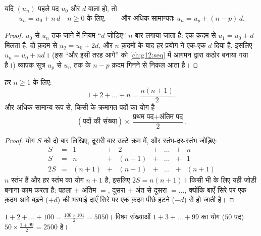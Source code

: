 \begin{theorem}[व्यापक पद]\label{thm:g11:seq:arithgeneral}
यदि $(u_n)$ पहले पद $u_0$ और  $d$ वाला  हो, तो
\[
u_n = u_0 + n\,d \quad n \geq 0 \text{ के लिए},
\qquad\text{और अधिक सामान्यतः } u_n = u_p + (n - p)\,d .
\]
\end{theorem}

\begin{proof}
$u_0$ से $u_n$ तक जाने में नियम ``$d$ जोड़िए'' $n$ बार लगाया जाता है: एक
क़दम से $u_1 = u_0 + d$ मिलता है, दो क़दम से $u_2 = u_0 + 2d$, और $n$ क़दमों के बाद हर प्रयोग ने
एक-एक $d$ दिया है, इसलिए $u_n = u_0 + nd$। (इस ``और इसी तरह आगे'' को \cref{ch:g12:seq} में आगमन
द्वारा कठोर बनाया गया है।) व्यापक सूत्र $u_p$ से $u_n$ तक के $n - p$ क़दम गिनने
से निकल आता है।
\end{proof}

\begin{theorem}[क्रमागत पूर्णांकों का योग]\label{thm:g11:seq:intsum}
हर  $n \geq 1$ के लिए:
\[
1 + 2 + \dots + n = \frac{n(n+1)}{2}.
\]
और अधिक सामान्य रूप से, किसी  के क्रमागत पदों का योग है
\[
(\text{पदों की संख्या}) \times
\frac{\text{प्रथम पद} + \text{अंतिम पद}}{2}.
\]
\end{theorem}

\begin{proof}
योग $S$ को दो बार लिखिए, दूसरी बार उल्टे क्रम में, और स्तंभ-दर-स्तंभ
जोड़िए:
\[
\begin{array}{ccccccccc}
S & = & 1 & + & 2 & + & \dots & + & n\\
S & = & n & + & (n-1) & + & \dots & + & 1\\
\hline
2S & = & (n+1) & + & (n+1) & + & \dots & + & (n+1)
\end{array}
\]
$n$ स्तंभ हैं और हर स्तंभ का योग $n + 1$ है, इसलिए $2S = n(n+1)$। किसी भी  के लिए यही जोड़ी बनाना काम करता है: पहला $+$ अंतिम $=$, दूसरा
$+$ अंत से दूसरा $= \dots$, क्योंकि बाएँ सिरे पर एक क़दम आगे बढ़ने ($+d$) की
भरपाई दाएँ सिरे पर एक क़दम पीछे हटने ($-d$) से हो जाती है।
\end{proof}

\begin{example}
$1 + 2 + \dots + 100 = \frac{100 \times 101}{2} = 5050$। विषम संख्याओं $1 + 3 + \dots + 99$ का योग ($50$ पद) $50 \times \frac{1 + 99}{2} = 2500$ है।
\end{example}

